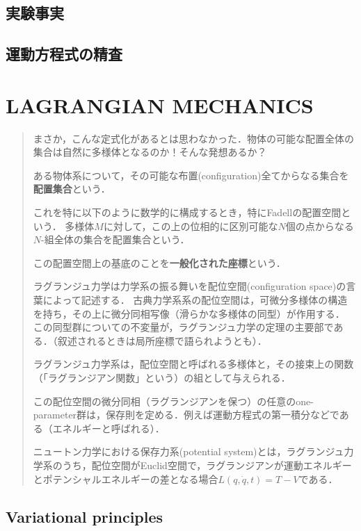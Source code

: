 \documentclass[uplatex,dvipdfmx]{jsreport}
\begin{document}
\chapter{実験事実}

\chapter{運動方程式の精査}

\part{LAGRANGIAN MECHANICS}

\begin{abstract}
    まさか，こんな定式化があるとは思わなかった．物体の可能な配置全体の集合は自然に多様体となるのか！そんな発想あるか？
    \begin{definition}
        ある物体系について，その可能な布置(configuration)全てからなる集合を\textbf{配置集合}という．

        これを特に以下のように数学的に構成するとき，特にFadellの配置空間という．
        多様体$M$に対して，この上の位相的に区別可能な$N$個の点からなる$N$-組全体の集合を配置集合という．

        この配置空間上の基底のことを\textbf{一般化された座標}という．
    \end{definition}
    ラグランジュ力学は力学系の振る舞いを配位空間(configuration space)の言葉によって記述する．
    古典力学系系の配位空間は，可微分多様体の構造を持ち，その上に微分同相写像（滑らかな多様体の同型）が作用する．
    この同型群についての不変量が，ラグランジュ力学の定理の主要部である．（叙述されるときは局所座標で語られようとも）．

    ラグランジュ力学系は，配位空間と呼ばれる多様体と，その接束上の関数（「ラグランジアン関数」という）の組として与えられる．

    この配位空間の微分同相（ラグランジアンを保つ）の任意のone-parameter群は，保存則を定める．例えば運動方程式の第一積分などである（エネルギーと呼ばれる）．

    ニュートン力学における保存力系(potential system)とは，ラグランジュ力学系のうち，配位空間がEuclid空間で，ラグランジアンが運動エネルギーとポテンシャルエネルギーの差となる場合$L(q,\dot{q},t)=T-V$である．
\end{abstract}

\chapter{Variational principles}
\end{document}

